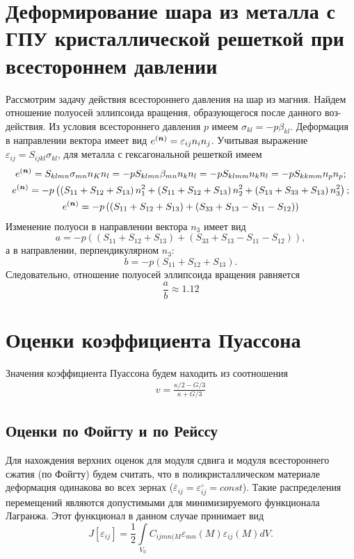 \documentclass[12pt, a4paper]{article}
\renewcommand{\vec}[1]{\text{\mathversion{bold}${#1}$}}%
\begin{document}
\section{Деформирование шара из металла с ГПУ кристаллической решеткой при всестороннем давлении}

Рассмотрим задачу действия всестороннего давления на шар из магния. Найдем отношение полуосей эллипсоида вращения, образующегося после данного воз-
действия.
Из условия всестороннего давления $p$ имеем $\sigma_{kl} = - p \beta_{kl}$.
Деформация в направлении вектора имеет вид $e^{(\vec{n})} = \varepsilon_{ij}n_in_j$.
Учитывая выражение $\varepsilon_{ij} = S_{ijkl}\sigma_{kl}$, для металла
с гексагональной решеткой имеем
\begin{gather*}
e^{(\vec{n})} = S_{klmn} \sigma_{mn} n_K n_l = - p S_{klmn} \beta_{mn} n_k n_l = - p S_{klmm} n_k n_l = - p S_{kkmm}n_p n_p;\\
e^{(\vec{n})} = -p \left(\left(S_{11} + S_{12} + S_{13} \right)n_1^2 + \left(S_{11} + S_{12} + S_{13} \right)n_2^2 + \left(S_{13} + S_{33} + S_{13} \right)n_3^2 \right);\\
e^{(\vec{n})} = -p \left( \left( S_{11} + S_{12} + S_{13}\right) + \left( S_{33} + S_{13} - S_{11} - S_{12}\right) \right)
\end{gather*}
Изменение полуоси в направлении вектора $n_3$ имеет вид
\[
a = - p \left( \left( S_{11} + S_{12} + S_{13}\right) + \left( S_{33} + S_{13} - S_{11} - S_{12}\right) \right),
\]
а в направлении, перпендикулярном $n_3$:
\[
b = -p  \left( S_{11} + S_{12} + S_{13}\right).
\]
Следовательно, отношение полуосей эллипсоида вращения равняется
\[
\frac{a}{b} \approx 1.12
\]

\section{Оценки коэффициента Пуассона}
Значения коэффициента Пуассона будем находить из соотношения 
\begin{gather}
	\label{puasson-4}
	v = \frac{\kappa / 2 - G / 3}{\kappa + G / 3}
\end{gather}

\subsection{Оценки по Фойгту и по Рейссу}
Для нахождения верхних оценок для модуля сдвига и модуля всестороннего сжатия (по Фойгту) будем считать, что в поликристаллическом материале деформация одинакова во всех зернах ($\bar{\varepsilon}_{ij} = \varepsilon_{ij}^{\circ} = const$). Такие распределения перемещений являются допустимыми для минимизируемого функционала Лагранжа. Этот функционал
в данном случае принимает вид
\[
J[\varepsilon_{ij}] = \frac{1}{2} \int \limits_{V_0} {C_{ijmn (M} \varepsilon_{mn} (M) \varepsilon_{ij} (M) d V}.
\]
\end{document}
